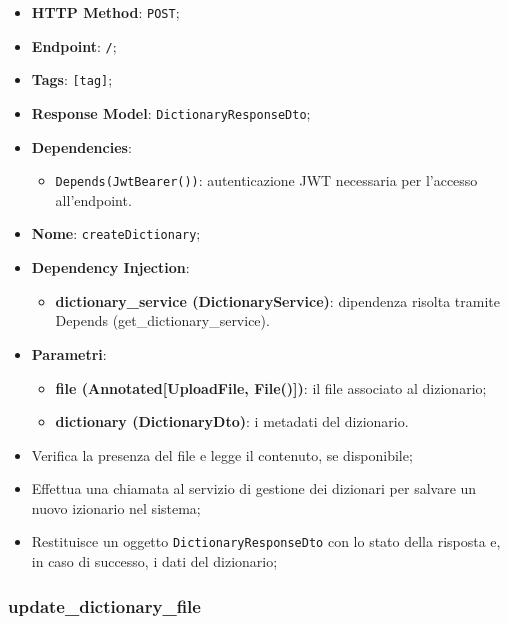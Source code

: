 \begin{itemize}
  \item \textbf{HTTP Method}: \texttt{POST};
  \item \textbf{Endpoint}: \texttt{/};
  \item \textbf{Tags}: \texttt{[tag]};
  \item \textbf{Response Model}: \texttt{DictionaryResponseDto};
  \item \textbf{Dependencies}:
  \begin{itemize}
    \item \texttt{Depends(JwtBearer())}: autenticazione JWT necessaria per l'accesso all'endpoint.
  \end{itemize}
  \item \textbf{Nome}: \texttt{createDictionary};
  \item \textbf{Dependency Injection}:
  \begin{itemize}
    \item \textbf{dictionary\_service (DictionaryService)}: dipendenza risolta tramite Depends (get\_dictionary\_service).
  \end{itemize}
  \item \textbf{Parametri}:
  \begin{itemize}
    \item \textbf{file (Annotated[UploadFile, File()])}: il file associato al dizionario;
    \item \textbf{dictionary (DictionaryDto)}: i metadati del dizionario.
  \end{itemize}
\end{itemize}

\begin{itemize}
  \item Verifica la presenza del file e legge il contenuto, se disponibile;
  \item Effettua una chiamata al servizio di gestione dei dizionari per salvare un nuovo izionario nel sistema;
  \item Restituisce un oggetto \texttt{DictionaryResponseDto} con lo stato della risposta e, in caso di successo, i dati del dizionario;
\end{itemize}

\subsubsection{update\_dictionary\_file}

